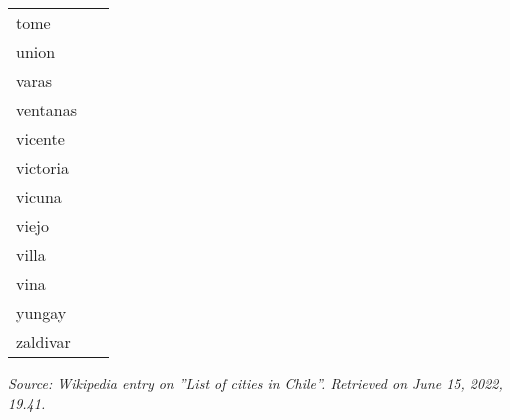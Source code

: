 \begin{longtable}{l|l}
             tome   & ~ \\  
             union   & ~ \\  
             varas   & ~ \\  
             ventanas   & ~ \\  
             vicente   & ~ \\  
             victoria   & ~ \\  
             vicuna   & ~ \\  
             viejo   & ~ \\  
             villa   & ~ \\  
             vina   & ~ \\  
             yungay   & ~ \\  
            zaldivar & ~ 
        \end{longtable}
        {\it Source: Wikipedia entry on ''List of cities in Chile''. Retrieved on June 15, 2022, 19.41.}
        
